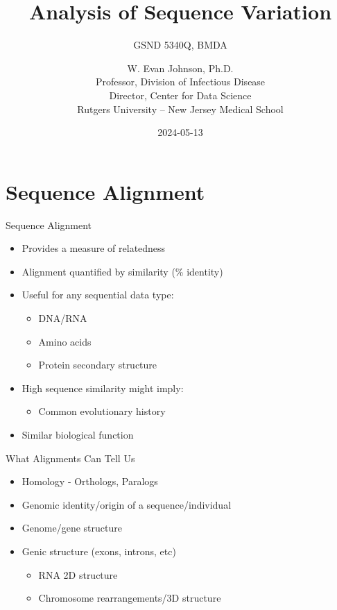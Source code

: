 \documentclass[
  ignorenonframetext,
]{beamer}
\title{Analysis of Sequence Variation}
\subtitle{GSND 5340Q, BMDA}
\author{W. Evan Johnson, Ph.D.\\
Professor, Division of Infectious Disease\\
Director, Center for Data Science\\
Rutgers University -- New Jersey Medical School}
\date{2024-05-13}
\providecommand{\tightlist}{%
  \setlength{\itemsep}{0pt}\setlength{\parskip}{0pt}}
\begin{document}
\frame{\titlepage}

\section{Sequence Alignment}\label{sequence-alignment}

\begin{frame}{Sequence Alignment}
\label{sequence-alignment-1}
\Large

\begin{itemize}
\tightlist
\item
  Provides a measure of relatedness
\item
  Alignment quantified by similarity (\% identity)
\item
  Useful for any sequential data type:

  \begin{itemize}
  \tightlist
  \item
    DNA/RNA
  \item
    Amino acids
  \item
    Protein secondary structure
  \end{itemize}
\item
  High sequence similarity might imply:

  \begin{itemize}
  \tightlist
  \item
    Common evolutionary history
  \end{itemize}
\item
  Similar biological function
\end{itemize}
\end{frame}

\begin{frame}{What Alignments Can Tell Us}
\label{what-alignments-can-tell-us}
\Large

\begin{itemize}
\tightlist
\item
  Homology - Orthologs, Paralogs
\item
  Genomic identity/origin of a sequence/individual
\item
  Genome/gene structure
\item
  Genic structure (exons, introns, etc)

  \begin{itemize}
  \tightlist
  \item
    RNA 2D structure
  \item
    Chromosome rearrangements/3D structure
  \end{itemize}
\end{itemize}
\end{frame}
\end{document}
